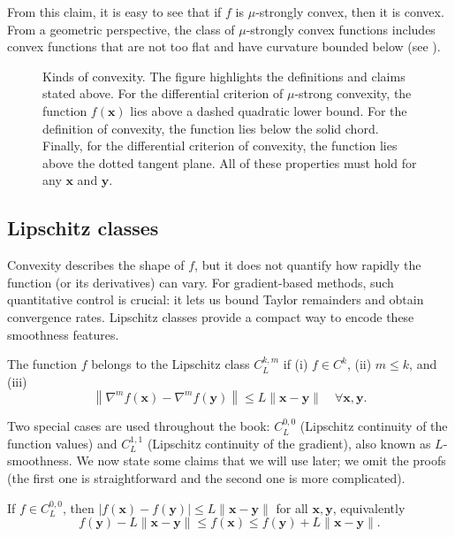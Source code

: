 \noindent From this claim, it is easy to see that if $f$ is $\mu$-strongly convex, then it
is convex. From a geometric perspective, the class of $\mu$-strongly convex functions
includes convex functions that are not too flat and have curvature bounded below (see ).

\begin{figure}[ht]
    \centering
    \caption{Kinds of convexity. The figure highlights the definitions and claims stated
    above. For the differential criterion of $\mu$-strong convexity, the function $f(\mathbf{x})$
    lies above a dashed quadratic lower bound. For the definition of convexity, the function
    lies below the solid chord. Finally, for the differential criterion of convexity, the
    function lies above the dotted tangent plane. All of these properties must hold for any
    $\mathbf{x}$ and $\mathbf{y}$.}
    \label{fig:kinds-of-convexity}
\end{figure}
\subsection{Lipschitz classes}

Convexity describes the shape of $f$, but it does not quantify how rapidly the function (or
its derivatives) can vary. For gradient-based methods, such quantitative control is crucial:
it lets us bound Taylor remainders and obtain convergence rates. Lipschitz classes provide
a compact way to encode these smoothness features.

\begin{definition}
The function $f$ belongs to the Lipschitz class $C_{L}^{k, m}$ if (i) 
$f \in C^{k}$, (ii) $m \leq k$, and (iii)
\[
\left\|\nabla^{m} f(\mathbf{x})-\nabla^{m} f(\mathbf{y})\right\|
\leq L\|\mathbf{x}-\mathbf{y}\|
\quad \forall \mathbf{x}, \mathbf{y} .
\]
\end{definition}

Two special cases are used throughout the book: $C_L^{0,0}$ (Lipschitz continuity of the
function values) and $C_L^{1,1}$ (Lipschitz continuity of the gradient), also known as
$L$-smoothness. We now state some claims that we will use later; we omit the proofs (the
first one is straightforward and the second one is more complicated).
\begin{claim}
If $f \in C_{L}^{0,0}$, then $|f(\mathbf{x})-f(\mathbf{y})| \leq L\|\mathbf{x}-\mathbf{y}\|$
for all $\mathbf{x}, \mathbf{y}$,
  equivalently
\[
f(\mathbf{y})-L\|\mathbf{x}-\mathbf{y}\| \leq f(\mathbf{x})
\leq f(\mathbf{y})+L\|\mathbf{x}-\mathbf{y}\| .
\]
\end{claim}

